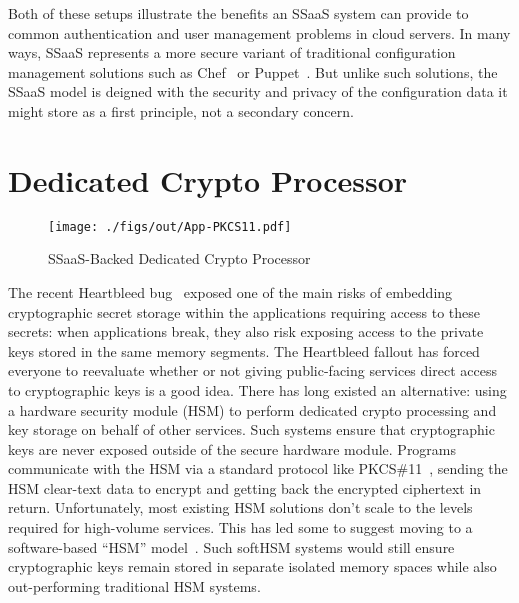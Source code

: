 Both of these setups illustrate the benefits an SSaaS system can
provide to common authentication and user management problems in cloud
servers. In many ways, SSaaS represents a more secure variant of
traditional configuration management solutions such as
Chef~\cite{chef} or Puppet~\cite{puppet}. But unlike such solutions,
the SSaaS model is deigned with the security and privacy of the
configuration data it might store as a first principle, not a
secondary concern.

\section{Dedicated Crypto Processor}

\begin{figure}[t]
  \centering
  \texttt{[image: ./figs/out/App-PKCS11.pdf]}
  \caption{SSaaS-Backed Dedicated Crypto Processor}
  \label{fig:app-pkcs11}
\end{figure}

The recent Heartbleed bug~\cite{heartbleed} exposed one of the main
risks of embedding cryptographic secret storage within the
applications requiring access to these secrets: when applications
break, they also risk exposing access to the private keys stored in
the same memory segments. The Heartbleed fallout has forced everyone
to reevaluate whether or not giving public-facing services direct
access to cryptographic keys is a good idea. There has long existed an
alternative: using a hardware security module (HSM) to perform
dedicated crypto processing and key storage on behalf of other
services. Such systems ensure that cryptographic keys are never
exposed outside of the secure hardware module. Programs communicate
with the HSM via a standard protocol like
PKCS\#11~\cite{pcks11-standard}, sending the HSM clear-text data to
encrypt and getting back the encrypted ciphertext in
return. Unfortunately, most existing HSM solutions don't scale to the
levels required for high-volume services. This has led some to suggest
moving to a software-based ``HSM'' model~\cite{lorier-pkcs11}. Such
softHSM systems would still ensure cryptographic keys remain stored in
separate isolated memory spaces while also out-performing traditional
HSM systems.

